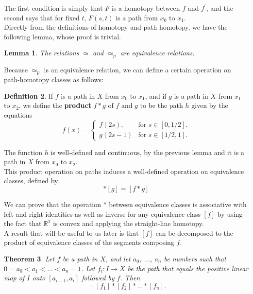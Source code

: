 \documentclass[psamsfonts]{amsart}
\newtheorem{thm}{Theorem}[section]
\newtheorem{lem}[thm]{Lemma}
\theoremstyle{definition}
\newtheorem{defn}[thm]{Definition}
\theoremstyle{remark}
\numberwithin{equation}{section}
\begin{document}
	The first condition is simply that $F$ is a homotopy between $f$ and $f^\prime$, and the second says that for fixed $t$, $F(s,t)$ is a path from $x_0$ to $x_1$.\\
	Directly from the definitions of homotopy and path homotopy, we have the following lemma, whose proof is trivial.
	
	\begin{lem}
		The relations $\simeq$ and $\simeq_p$ are equivalence relations.
	\end{lem}
	
	Because $\simeq_p$ is an equivalence relation, we can define a certain operation on path-homotopy classes as follows:
	\begin{defn}
		If $f$ is a path in $X$ from $x_0$ to $x_1$, and if $g$ is a path in $X$ from $x_1$ to $x_2$, we define the \textbf{product} $f*g$ of $f$ and $g$ to be the path $h$ given by the equations
		\begin{equation}
			f(x) = \begin{cases}
			f(2s), & \text{for $s\in [0,1/2]$}.\\
			g(2s-1) & \text{for $s \in [1/2, 1]$}.
			\end{cases}
		\end{equation} 
	\end{defn}
	
	The function $h$ is well-defined and continuous, by the previous lemma and it is a path in $X$ from $x_0$ to $x_2$.\\
	This product operation on paths induces a well-defined operation on equivalence classes, defined by
	\begin{equation}
		[f]*[g] = [f*g]
	\end{equation}
	
	We can prove that the operation $*$ between equivalence classes is associative with left and right identities as well as inverse for any equivalence class $[f]$ by using the fact that $\mathbb{R}^2$ is convex and applying the straight-line homotopy.\\
	A result that will be useful to us later is that $[f]$ can be decomposed to the product of equivalence classes of the segments composing $f$.
	\begin{thm}
		Let $f$ be a path in $X$, and let $a_0$, ..., $a_n$ be numbers such that $0=a_0<a_1<...<a_n=1$. Let $f_i:I \to X$ be the path that equals the positive linear map of $I$ onto $[a_{i-1}, a_i]$ followed by $f$. Then
		\begin{equation}
			[f] = [f_1]*[f_2]*...*[f_n].
		\end{equation}
	\end{thm}
	
\end{document}
